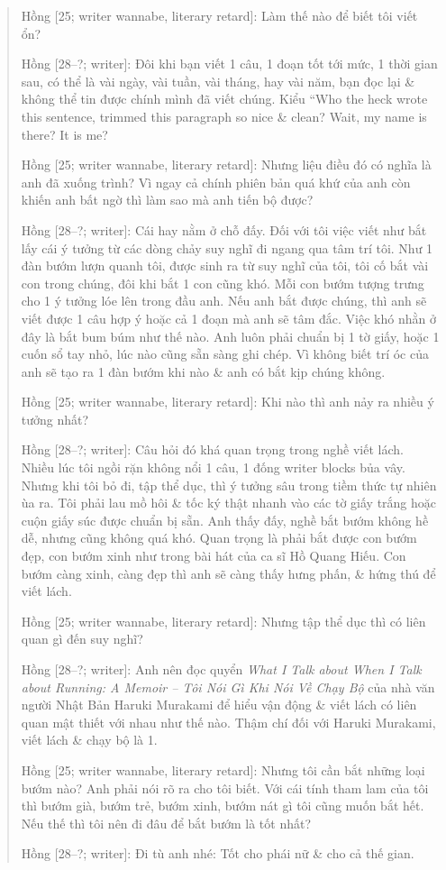 \documentclass[12pt,twoside]{book}
\begin{document}
\begin{quote}
	{\sf Hồng [25; writer wannabe, literary retard]}: Làm thế nào để biết tôi viết ổn?
	
	{\sf Hồng [28--?; writer]}: Đôi khi bạn viết 1 câu, 1 đoạn tốt tới mức, 1 thời gian sau, có thể là vài ngày, vài tuần, vài tháng, hay vài năm, bạn đọc lại \& không thể tin được chính mình đã viết chúng. Kiểu ``Who the heck wrote this sentence, trimmed this paragraph so nice \& clean? Wait, my name is there? It is me?
	
	{\sf Hồng [25; writer wannabe, literary retard]}: Nhưng liệu điều đó có nghĩa là anh đã xuống trình? Vì ngay cả chính phiên bản quá khứ của anh còn khiến anh bất ngờ thì làm sao mà anh tiến bộ được?
	
	{\sf Hồng [28--?; writer]}: Cái hay nằm ở chỗ đấy. Đối với tôi việc viết như bắt lấy cái ý tưởng từ các dòng chảy suy nghĩ đi ngang qua tâm trí tôi. Như 1 đàn bướm lượn quanh tôi, được sinh ra từ suy nghĩ của tôi, tôi cố bắt vài con trong chúng, đôi khi bắt 1 con cũng khó. Mỗi con bướm tượng trưng cho 1 ý tưởng lóe lên trong đầu anh. Nếu anh bắt được chúng, thì anh sẽ viết được 1 câu hợp ý hoặc cả 1 đoạn mà anh sẽ tâm đắc. Việc khó nhằn ở đây là bắt bum búm như thế nào. Anh luôn phải chuẩn bị 1 tờ giấy, hoặc 1 cuốn sổ tay nhỏ, lúc nào cũng sẵn sàng ghi chép. Vì không biết trí óc của anh sẽ tạo ra 1 đàn bướm khi nào \& anh có bắt kịp chúng không.
	
	{\sf Hồng [25; writer wannabe, literary retard]}: Khi nào thì anh nảy ra nhiều ý tưởng nhất?
	
	{\sf Hồng [28--?; writer]}: Câu hỏi đó khá quan trọng trong nghề viết lách. Nhiều lúc tôi ngồi rặn không nổi 1 câu, 1 đống writer blocks bủa vây. Nhưng khi tôi bỏ đi, tập thể dục, thì ý tưởng sâu trong tiềm thức tự nhiên ùa ra. Tôi phải lau mồ hôi \& tốc ký thật nhanh vào các tờ giấy trắng hoặc cuộn giấy súc được chuẩn bị sẵn. Anh thấy đấy, nghề bắt bướm không hề dễ, nhưng cũng không quá khó. Quan trọng là phải bắt được con bướm đẹp, con bướm xinh như trong bài hát của ca sĩ {\sc Hồ Quang Hiếu}. Con bướm càng xinh, càng đẹp thì anh sẽ càng thấy hưng phấn, \& hứng thú để viết lách.
	
	{\sf Hồng [25; writer wannabe, literary retard]}: Nhưng tập thể dục thì có liên quan gì đến suy nghĩ?
	
	{\sf Hồng [28--?; writer]}: Anh nên đọc quyển {\it What I Talk about When I Talk about Running: A Memoir -- Tôi Nói Gì Khi Nói Về Chạy Bộ} của nhà văn người Nhật Bản {\sc Haruki Murakami} để hiểu vận động \& viết lách có liên quan mật thiết với nhau như thế nào. Thậm chí đối với {\sc Haruki Murakami}, viết lách \& chạy bộ là 1.
	
	{\sf Hồng [25; writer wannabe, literary retard]}: Nhưng tôi cần bắt những loại bướm nào? Anh phải nói rõ ra cho tôi biết. Với cái tính tham lam của tôi thì bướm già, bướm trẻ, bướm xinh, bướm nát gì tôi cũng muốn bắt hết. Nếu thế thì tôi nên đi đâu để bắt bướm là tốt nhất?
	
	{\sf Hồng [28--?; writer]}: Đi tù anh nhé: Tốt cho phái nữ \& cho cả thế gian.
\end{quote}
\end{document}
